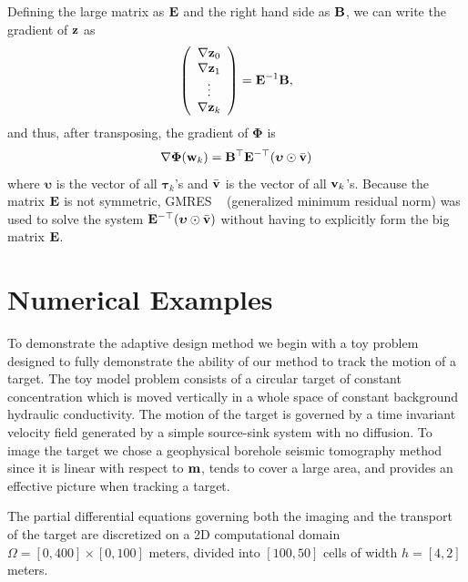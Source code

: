\documentclass[11pt]{article}
\newcommand{\bfB}	{{\bf{B}}}
\newcommand{\bfE}	{{\bf{E}}}
\newcommand{\bfm}	{{\bf{m}}}
\newcommand{\bfv}	{{\bf{v}}}
\newcommand{\bfw}	{{\bf{w}}}
\newcommand{\bfz}	{{\bf{z}}}
\newcommand{\bfPhi}     {{\boldsymbol \Phi}}
\newcommand{\bftau}      {{\boldsymbol \tau}}
\newcommand{\bfupsilon}      {{\boldsymbol \upsilon}}
\newcommand{\grad}	{\ensuremath {{\bf{ \nabla}}}}
\begin{document}
Defining the large matrix as $\bfE$ and the right hand side as $\bfB$, we can write the gradient of $\bfz$ as 
\begin{equation}
\left(\begin{array}{c} \grad\bfz_0 \\ \grad\bfz_1\\ \vdots\\ \grad\bfz_k \end{array}\right) = \bfE^{-1}\bfB,
\end{equation}
and thus, after transposing, the gradient of $\bfPhi$ is
\begin{equation}
\nabla \bfPhi(\bfw_k) = \bfB^{\top}\bfE^{- \top}(\bfupsilon \odot \bar{\bfv})
\end{equation}
where $\bfupsilon$ is the vector of all $\bftau_k$'s and $\bar{\bfv}$ is the vector of all $\bfv_k$'s.
Because the matrix $\bfE$ is not symmetric, GMRES ~\cite{GMRES} (generalized minimum residual  norm) was used to solve the system $\bfE^{-\top}(\bfupsilon \odot \bar{\bfv})$ without having to explicitly form the big matrix $\bfE$.
 





\section{Numerical Examples }
\label{sec: Example1}
To demonstrate the adaptive  design method we begin with a toy problem designed to fully demonstrate the ability of our method to track the motion of a target. The toy model problem consists of a  circular target of constant concentration which is moved vertically in a whole space of constant background hydraulic conductivity. The motion of the target is governed by  a time invariant velocity field generated by a simple source-sink  system with no diffusion. 
To image the target we chose a geophysical  borehole seismic tomography method since it is linear with respect to $\bfm$, tends to cover a large area, and provides an effective picture when tracking a target. 

The partial differential equations governing both the imaging and the transport of the target are discretized on a  2D computational domain  $\Omega=[0, 400] \times [0, 100]$ meters,  divided into $[100, 50]$ cells of width $h = [4,2]$ meters.
\end{document}
